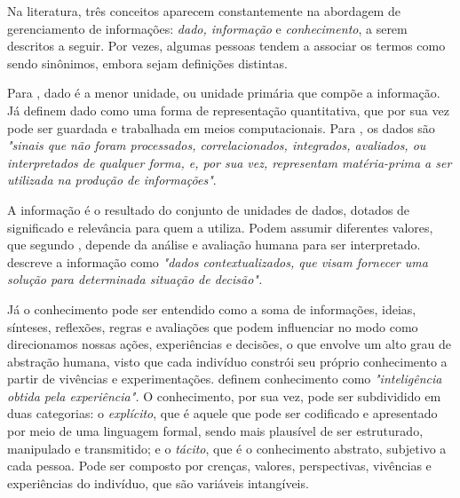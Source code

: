 Na literatura, três conceitos aparecem constantemente na abordagem de gerenciamento de informações: \textit{dado, informação} e \textit{conhecimento}, a serem descritos a seguir. Por vezes, algumas pessoas tendem a associar os termos como sendo sinônimos, embora sejam definições distintas.

 Para \citet{siqueira2005}, dado é a menor unidade, ou unidade primária que compõe a informação. Já \citet{cardoso_machado2008} definem dado como uma forma de representação quantitativa, que por sua vez pode ser guardada e trabalhada em meios computacionais. Para \citet[p. 15]{russo2010}, os dados são \textit{"sinais que não foram processados, correlacionados, integrados, avaliados, ou interpretados de qualquer forma, e, por sua vez, representam matéria-prima a ser utilizada na produção de informações"}.
 
 A informação é o resultado do conjunto de unidades de dados, dotados de significado e relevância para quem a utiliza. Podem assumir diferentes valores, que segundo \citet{siqueira2005}, depende da análise e avaliação humana para ser interpretado. \citet[p. 15 \textit{apud} Lussato (2010)]{russo2010} descreve a informação como \textit{"dados contextualizados, que visam fornecer uma solução para determinada situação de decisão".}
 
 Já o conhecimento pode ser entendido como a soma de informações, ideias, sínteses, reflexões, regras e  avaliações que podem influenciar no modo como direcionamos nossas ações, experiências e decisões, o que envolve um alto grau de abstração humana, visto que cada indivíduo constrói seu próprio conhecimento a partir de vivências e experimentações. \citet[p. 499]{cardoso_machado2008} definem conhecimento como \textit{"inteligência obtida pela experiência".}  O conhecimento, por sua vez, pode ser subdividido em duas categorias: o \textit{explícito}, que é aquele que pode ser codificado e apresentado por meio de uma linguagem formal, sendo mais plausível de ser estruturado, manipulado e transmitido; e o \textit{tácito}, que é o conhecimento abstrato, subjetivo a cada pessoa. Pode ser composto por crenças, valores, perspectivas, vivências e experiências do indivíduo, que são variáveis intangíveis. 
 
